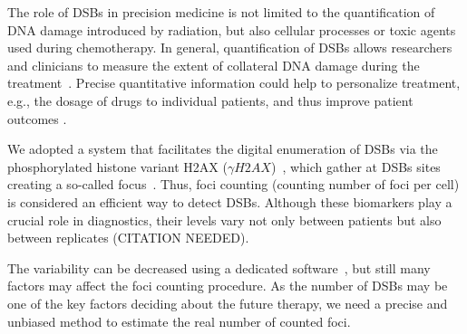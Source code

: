 The role of DSBs in precision medicine is not limited to the quantification of DNA damage introduced by radiation, but also cellular processes or toxic agents used during chemotherapy. In general, quantification of DSBs allows researchers and clinicians to measure the extent of collateral DNA damage during the treatment~\citep{eberlein_calibration_2015, ivashkevich_use_2012}. Precise quantitative information could help to personalize treatment, e.g., the dosage of drugs to individual patients, and thus improve patient outcomes \citep{redon_recent_2011}. %

We adopted a system that facilitates the digital enumeration of DSBs via the phosphorylated histone variant H2AX ($\gamma H2AX$)~\citep{rodiger_quantification_2018, ruhe_effect_2018}, which gather at DSBs sites creating a so-called focus~\citep{nikolova_h2ax_2014}. Thus, foci counting (counting number of foci per cell) is considered an efficient way to detect DSBs. Although these biomarkers play a crucial role in diagnostics, their levels vary not only between patients but also between replicates (CITATION NEEDED).


The variability can be decreased using a dedicated software~\citep{LapytskoFoCosimplerobust2015}, but still many factors may affect the foci counting procedure. As the number of DSBs may be one of the key factors deciding about the future therapy, we need a precise and unbiased method to estimate the real number of counted foci.  


